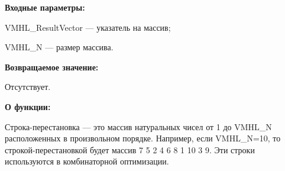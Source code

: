 \textbf{Входные параметры:}
 
VMHL\_ResultVector --- указатель на массив;
 
VMHL\_N --- размер массива.

\textbf{Возвращаемое значение:} 

Отсутствует.

\textbf{О функции:}

Строка-перестановка --- это массив натуральных чисел от 1 до VMHL\_N расположенных в произвольном порядке. Например, если VMHL\_N=10, то строкой-перестановкой будет массив 7 5 2 4 6 8 1 10 3 9. Эти строки используются в комбинаторной оптимизации.